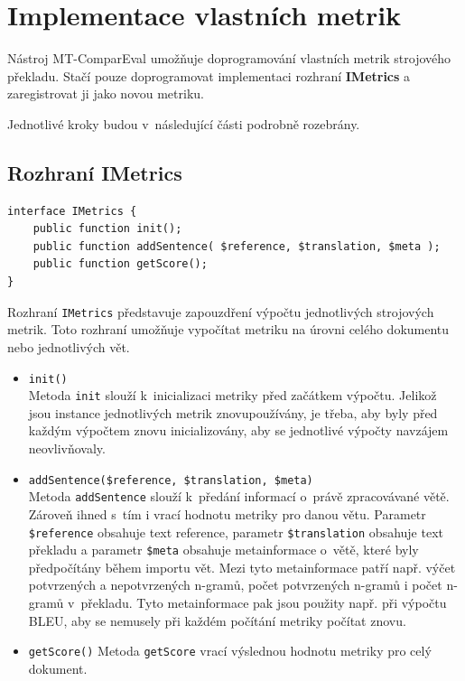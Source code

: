 \section{Implementace vlastních metrik}
\label{chap:own-metrics}

Nástroj \mbox{MT-ComparEval} umožňuje doprogramování vlastních metrik strojového překladu.
Stačí pouze doprogramovat implementaci rozhraní \textbf{IMetrics} a
  zaregistrovat ji jako novou metriku.

Jednotlivé kroky budou v~následující části podrobně rozebrány.

\subsection{Rozhraní IMetrics}
\begin{verbatim}
interface IMetrics {
    public function init();
    public function addSentence( $reference, $translation, $meta );
    public function getScore();
}
\end{verbatim}

Rozhraní \texttt{IMetrics} představuje zapouzdření výpočtu jednotlivých strojových metrik.
Toto rozhraní umožňuje vypočítat metriku na úrovni celého dokumentu nebo jednotlivých vět.

\begin{itemize}
	\item \texttt{init()} \\
		Metoda \texttt{init} slouží k~inicializaci metriky před začátkem výpočtu.	
		Jelikož jsou instance jednotlivých metrik znovupoužívány,
		  je třeba,
		  aby byly před každým výpočtem znovu inicializovány,
		  aby se jednotlivé výpočty navzájem neovlivňovaly.

	
	\item \texttt{addSentence(\$reference, \$translation, \$meta)} \\
		Metoda \texttt{addSentence} slouží k~předání informací o~právě zpracovávané větě.
		Zároveň ihned s~tím i vrací hodnotu metriky pro danou větu.
		Parametr \texttt{\$reference} obsahuje text reference, 
                  parametr \texttt{\$translation} obsahuje text překladu a
                  parametr \texttt{\$meta} obsahuje metainformace o~větě,
                  které byly předpočítány během importu vět.
                Mezi tyto metainformace patří např. výčet potvrzených a nepotvrzených \mbox{n-gramů},
                  počet potvrzených \mbox{n-gramů} i počet \mbox{n-gramů} v~překladu.
		Tyto metainformace pak jsou použity např. při výpočtu BLEU,
		  aby se nemusely při každém počítání metriky počítat znovu.

	\item \texttt{getScore()}
		Metoda \texttt{getScore} vrací výslednou hodnotu metriky pro celý dokument.
 
\end{itemize}


